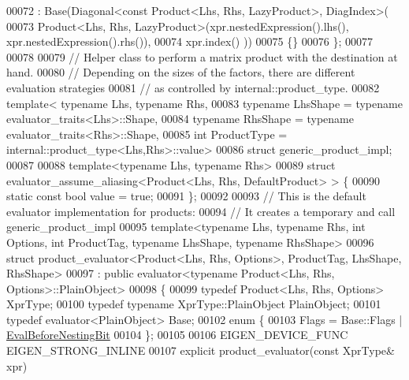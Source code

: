 \begin{DoxyCode}
00072     : Base(Diagonal<const Product<Lhs, Rhs, LazyProduct>, DiagIndex>(
00073         Product<Lhs, Rhs, LazyProduct>(xpr.nestedExpression().lhs(), xpr.nestedExpression().rhs()),
00074         xpr.index() ))
00075   \{\}
00076 \};
00077 
00078 
00079 \textcolor{comment}{// Helper class to perform a matrix product with the destination at hand.}
00080 \textcolor{comment}{// Depending on the sizes of the factors, there are different evaluation strategies}
00081 \textcolor{comment}{// as controlled by internal::product\_type.}
00082 \textcolor{keyword}{template}< \textcolor{keyword}{typename} Lhs, \textcolor{keyword}{typename} Rhs,
00083           \textcolor{keyword}{typename} LhsShape = \textcolor{keyword}{typename} evaluator\_traits<Lhs>::Shape,
00084           \textcolor{keyword}{typename} RhsShape = \textcolor{keyword}{typename} evaluator\_traits<Rhs>::Shape,
00085           \textcolor{keywordtype}{int} ProductType = internal::product\_type<Lhs,Rhs>::value>
00086 \textcolor{keyword}{struct }generic\_product\_impl;
00087 
00088 \textcolor{keyword}{template}<\textcolor{keyword}{typename} Lhs, \textcolor{keyword}{typename} Rhs>
00089 \textcolor{keyword}{struct }evaluator\_assume\_aliasing<Product<Lhs, Rhs, DefaultProduct> > \{
00090   \textcolor{keyword}{static} \textcolor{keyword}{const} \textcolor{keywordtype}{bool} value = \textcolor{keyword}{true};
00091 \};
00092 
00093 \textcolor{comment}{// This is the default evaluator implementation for products:}
00094 \textcolor{comment}{// It creates a temporary and call generic\_product\_impl}
00095 \textcolor{keyword}{template}<\textcolor{keyword}{typename} Lhs, \textcolor{keyword}{typename} Rhs, \textcolor{keywordtype}{int} Options, \textcolor{keywordtype}{int} ProductTag, \textcolor{keyword}{typename} LhsShape, \textcolor{keyword}{typename} RhsShape>
00096 \textcolor{keyword}{struct }product\_evaluator<Product<Lhs, Rhs, Options>, ProductTag, LhsShape, RhsShape>
00097   : \textcolor{keyword}{public} evaluator<typename Product<Lhs, Rhs, Options>::PlainObject>
00098 \{
00099   \textcolor{keyword}{typedef} Product<Lhs, Rhs, Options> XprType;
00100   \textcolor{keyword}{typedef} \textcolor{keyword}{typename} XprType::PlainObject PlainObject;
00101   \textcolor{keyword}{typedef} evaluator<PlainObject> Base;
00102   \textcolor{keyword}{enum} \{
00103     Flags = Base::Flags | \hyperlink{group__flags_gaa34e83bae46a8eeae4e69ebe3aaecbed}{EvalBeforeNestingBit}
00104   \};
00105 
00106   EIGEN\_DEVICE\_FUNC EIGEN\_STRONG\_INLINE
00107   \textcolor{keyword}{explicit} product\_evaluator(\textcolor{keyword}{const} XprType& xpr)

\end{DoxyCode}
